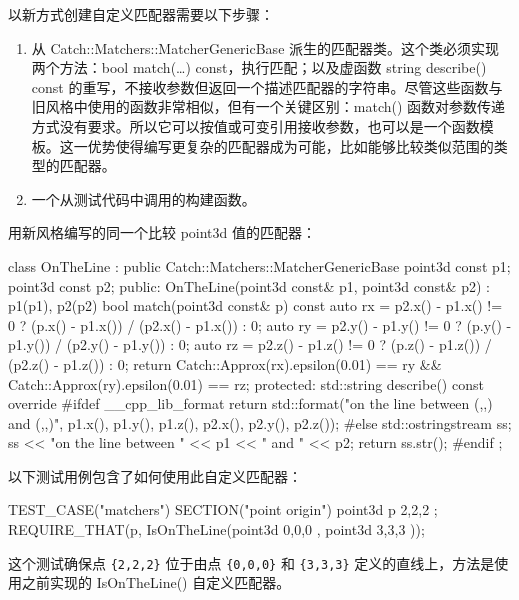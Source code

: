 以新方式创建自定义匹配器需要以下步骤：

\begin{enumerate}
\item
从 Catch::Matchers::MatcherGenericBase 派生的匹配器类。这个类必须实现两个方法：bool match(…) const，执行匹配；以及虚函数 string describe() const 的重写，不接收参数但返回一个描述匹配器的字符串。尽管这些函数与旧风格中使用的函数非常相似，但有一个关键区别：match() 函数对参数传递方式没有要求。所以它可以按值或可变引用接收参数，也可以是一个函数模板。这一优势使得编写更复杂的匹配器成为可能，比如能够比较类似范围的类型的匹配器。

\item
一个从测试代码中调用的构建函数。
\end{enumerate}

用新风格编写的同一个比较 point3d 值的匹配器：

\begin{cpp}
class OnTheLine : public Catch::Matchers::MatcherGenericBase
{
    point3d const p1;
    point3d const p2;
public:
    OnTheLine(point3d const& p1, point3d const& p2) :
        p1(p1), p2(p2)
    {
    }
    bool match(point3d const& p) const
    {
        auto rx = p2.x() - p1.x() != 0 ?
                  (p.x() - p1.x()) / (p2.x() - p1.x()) : 0;
        auto ry = p2.y() - p1.y() != 0 ?
                  (p.y() - p1.y()) / (p2.y() - p1.y()) : 0;
        auto rz = p2.z() - p1.z() != 0 ?
                  (p.z() - p1.z()) / (p2.z() - p1.z()) : 0;
        return
            Catch::Approx(rx).epsilon(0.01) == ry &&
            Catch::Approx(ry).epsilon(0.01) == rz;
    }
protected:
    std::string describe() const override
    {
#ifdef __cpp_lib_format
        return std::format("on the line between ({},{},{}) and ({},{},{})", p1.x(), p1.y(), p1.z(), p2.x(), p2.y(), p2.z());
#else
        std::ostringstream ss;
        ss << "on the line between " << p1 << " and " << p2;
        return ss.str();
#endif
    }
};
\end{cpp}

以下测试用例包含了如何使用此自定义匹配器：

\begin{cpp}
TEST_CASE("matchers")
{
    SECTION("point origin")
    {
        point3d p { 2,2,2 };
        REQUIRE_THAT(p, IsOnTheLine(point3d{ 0,0,0 }, point3d{ 3,3,3 }));
    }
}
\end{cpp}

这个测试确保点 \verb|{2,2,2}| 位于由点 \verb|{0,0,0}| 和 \verb|{3,3,3}| 定义的直线上，方法是使用之前实现的 IsOnTheLine() 自定义匹配器。
